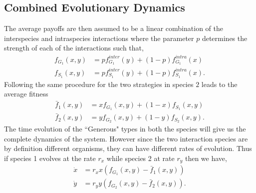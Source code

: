\documentclass[12pt]{article}
\begin{document}
\begin{appendices}
\section{Combined Evolutionary Dynamics}
\label{app:combineddyn}

The average payoffs are then assumed to be a linear combination of the interspecies and intraspecies interactions where the parameter $p$ determines the strength of each of the interactions such that,
%
\begin{align}
	f_{G_1} (x,y) &= p f^{inter}_{G_1} (y) + (1-p) f^{intra}_{G_1} (x)  \\
	f_{S_1} (x,y) &= p f^{inter}_{S_1} (y) + (1-p) f^{intra}_{S_1} (x).
\label{fiteqs}
\end{align}
%
Following the same procedure for the two strategies in species $2$ leads to the average fitness
%
\begin{align}
\bar{f}_1 (x,y) &= x f_{G_1} (x,y)+(1-x) f_ {S_1}(x,y)  \\
\bar{f}_2 (x,y) &= y f_{G_2} (x,y)+(1-y) f_{S_2}(x,y).
\label{avgfiteqs}
\end{align}
%
The time evolution of the ``Generous" types in both the species will give us the complete dynamics of the system.
However since the two interaction species are by definition different organisms, they can have different rates of evolution.
Thus if species 1 evolves at the rate $r_x$ while species 2 at rate $r_y$ then we have,
\begin{align}
\dot{x} &= r_x x \left(f_{G_1}(x,y) -  \bar{f}_1(x,y) \right)  \\
\dot{y} &= r_y y \left(f_{G_2}(x,y) -  \bar{f}_2(x,y) \right).
\label{eq:repeqapp}
\end{align}



\end{appendices}
\end{document}
